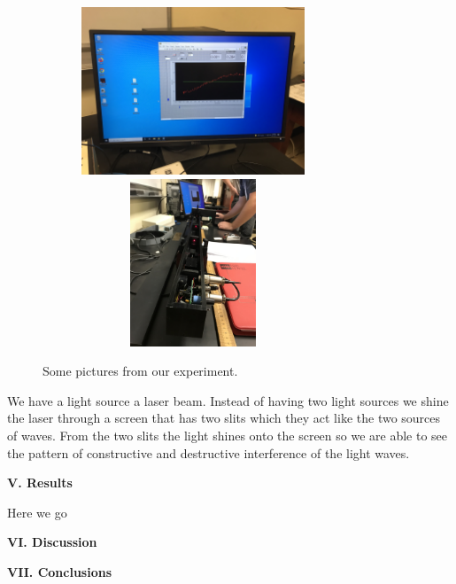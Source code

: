 \documentclass[fleqn]{article}
\begin{document}
\begin{figure}[h!]
    \includegraphics[height=5cm, width=9cm]{2 (5).jpg}
    \includegraphics[height=5cm, width=9cm]{2 (6).jpg}
    \caption{
      Some pictures from our experiment.
    }
  \end{figure}

  We have a light source a laser beam. Instead of having two light sources we shine the laser through a
  screen that has two slits which they act like the two sources of waves. From the two slits the light
  shines onto the screen so we are able to see the pattern of constructive and destructive interference 
  of the light waves.
  
  \vspace{20px}


  \textbf{V. Results}

  \vspace{10px}

  Here we go
  
  \vspace{20px}


  \textbf{VI. Discussion}

  \vspace{10px}

  
  \vspace{20px}


  \textbf{VII. Conclusions}

  \vspace{10px}

  
  \vspace{20px}


  \printbibliography
\end{document}
